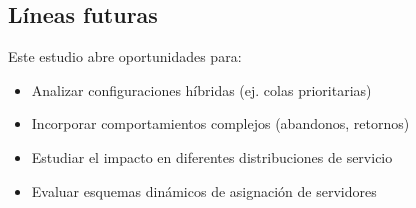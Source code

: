 \documentclass{article}
\begin{document}
\subsection{Líneas futuras}
Este estudio abre oportunidades para:
\begin{itemize}
\item Analizar configuraciones híbridas (ej. colas prioritarias)
\item Incorporar comportamientos complejos (abandonos, retornos)
\item Estudiar el impacto en diferentes distribuciones de servicio
\item Evaluar esquemas dinámicos de asignación de servidores
\end{itemize}

\newpage

\printbibliography
\end{document}
